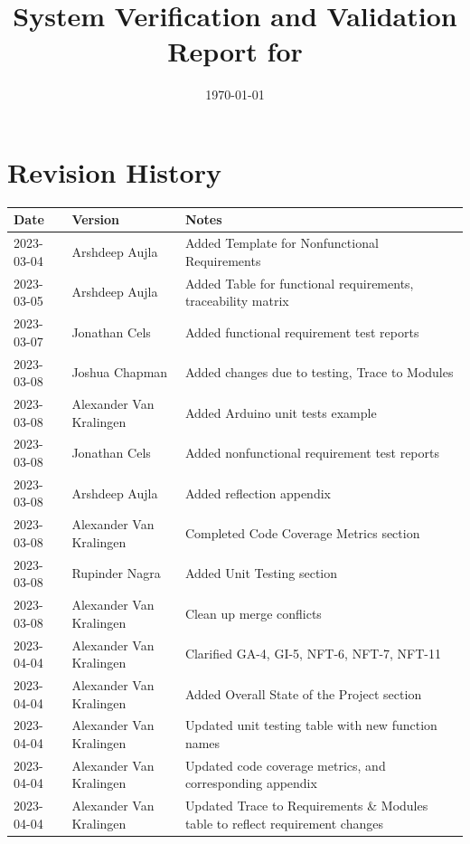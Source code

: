 \documentclass[12pt, titlepage]{article}
\begin{document}
\title{System Verification and Validation Report for \progname{}} 
\author{\authname}
\date{\today}
	
\maketitle


\section{Revision History}

\begin{tabularx}{\textwidth}{p{3cm}p{2cm}X}
\toprule {\bf Date} & {\bf Version} & {\bf Notes}\\
\midrule
2023-03-04 & Arshdeep Aujla & Added Template for Nonfunctional Requirements\\
2023-03-05 & Arshdeep Aujla & Added Table for functional requirements, traceability matrix\\
2023-03-07 & Jonathan Cels & Added functional requirement test reports\\
2023-03-08 & Joshua Chapman & Added changes due to testing, Trace to Modules\\
2023-03-08 & Alexander Van Kralingen & Added Arduino unit tests example\\
2023-03-08 & Jonathan Cels & Added nonfunctional requirement test reports\\
2023-03-08 & Arshdeep Aujla & Added reflection appendix\\
2023-03-08 & Alexander Van Kralingen & Completed Code Coverage Metrics section\\
2023-03-08 & Rupinder Nagra & Added Unit Testing section\\
2023-03-08 & Alexander Van Kralingen & Clean up merge conflicts\\
2023-04-04 & Alexander Van Kralingen & Clarified GA-4, GI-5, NFT-6, NFT-7, NFT-11\\
2023-04-04 & Alexander Van Kralingen & Added Overall State of the Project section\\
2023-04-04 & Alexander Van Kralingen & Updated unit testing table with new function names\\
2023-04-04 & Alexander Van Kralingen & Updated code coverage metrics, and corresponding appendix\\
2023-04-04 & Alexander Van Kralingen & Updated Trace to Requirements \& Modules table to reflect requirement changes\\
\bottomrule
\end{tabularx}
\end{document}
